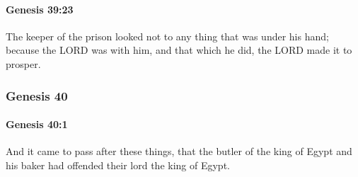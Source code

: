 		\paragraph{Genesis 39:23} %
			\label{GENESIS-39-23}

			The keeper of the prison looked not to any thing that was under his hand; because the LORD was with him, and that which he did, the LORD made it to prosper.

	\subsubsection{Genesis 40} %
		\label{GENESIS-40}

		\paragraph{Genesis 40:1} %
			\label{GENESIS-40-1}

			And it came to pass after these things, that the butler of the king of Egypt and his baker had offended their lord the king of Egypt.

